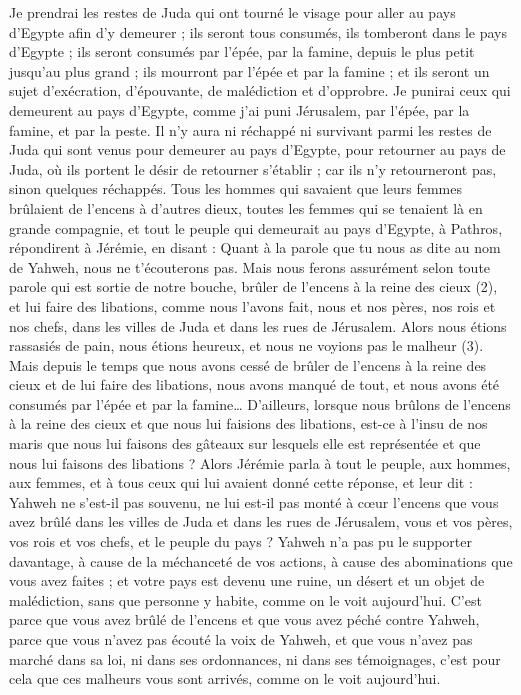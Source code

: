 \begin{multicols}{2}
Je prendrai les restes de Juda qui ont tourné le visage pour aller au pays d'Egypte afin d’y demeurer ; ils seront tous consumés, ils tomberont dans le pays d'Egypte ; ils seront consumés par l'épée, par la famine, depuis le plus petit jusqu’au plus grand ; ils mourront par l'épée et par la famine ; et ils seront un sujet d’exécration, d’épouvante, de malédiction et d’opprobre.
Je punirai ceux qui demeurent au pays d'Egypte, comme j'ai puni Jérusalem, par l'épée, par la famine, et par la peste.
Il n'y aura ni réchappé ni survivant parmi les restes de Juda qui sont venus pour demeurer au pays d'Egypte, pour retourner au pays de Juda, où ils portent le désir de retourner s’établir ; car ils n’y retourneront pas, sinon quelques réchappés.
Tous les hommes qui savaient que leurs femmes brûlaient de l’encens à d'autres dieux, toutes les femmes qui se tenaient là en grande compagnie, et tout le peuple qui demeurait au pays d'Egypte, à Pathros, répondirent à Jérémie, en disant :
Quant à la parole que tu nous as dite au nom de Yahweh, nous ne t'écouterons pas.
Mais nous ferons assurément selon toute parole qui est sortie de notre bouche, brûler de l’encens à la reine des cieux\FTNT{} (2), et lui faire des libations, comme nous l’avons fait, nous et nos pères, nos rois et nos chefs, dans les villes de Juda et dans les rues de Jérusalem. Alors nous étions rassasiés de pain, nous étions heureux, et nous ne voyions pas le malheur\FTNT{} (3).
Mais depuis le temps que nous avons cessé de brûler de l’encens à la reine des cieux et de lui faire des libations, nous avons manqué de tout, et nous avons été consumés par l'épée et par la famine…
D’ailleurs, lorsque nous brûlons de l’encens à la reine des cieux et que nous lui faisions des libations, est-ce à l'insu de nos maris que nous lui faisons des gâteaux sur lesquels elle est représentée et que nous lui faisons des libations ?
Alors Jérémie parla à tout le peuple, aux hommes, aux femmes, et à tous ceux qui lui avaient donné cette réponse, et leur dit :
Yahweh ne s'est-il pas souvenu, ne lui est-il pas monté à cœur l’encens que vous avez brûlé dans les villes de Juda et dans les rues de Jérusalem, vous et vos pères, vos rois et vos chefs, et le peuple du pays ?
Yahweh n'a pas pu le supporter davantage, à cause de la méchanceté de vos actions, à cause des abominations que vous avez faites ; et votre pays est devenu une ruine, un désert et un objet de malédiction, sans que personne y habite, comme on le voit aujourd'hui.
C’est parce que vous avez brûlé de l’encens et que vous avez péché contre Yahweh, parce que vous n'avez pas écouté la voix de Yahweh, et que vous n'avez pas marché dans sa loi, ni dans ses ordonnances, ni dans ses témoignages, c’est pour cela que ces malheurs vous sont arrivés, comme on le voit aujourd'hui.

\end{multicols}
